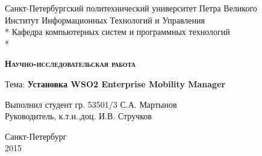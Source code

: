 \begin{titlepage}
\thispagestyle{empty}

\begin{center}
Санкт-Петербургский политехнический университет Петра Великого\\
Институт Информационных Технологий и Управления\\*
Кафедра компьютерных систем и программных технологий\\*
\hrulefill
\end{center}

\vspace{15em}

\begin{center}
\textsc{\textbf{Научно-исследовательская работа}}
\vspace{1em}

\vspace{2em}

Тема: \textbf{Установка WSO2 Enterprise Mobility Manager}
\end{center}

\vspace{16em}

\begin{flushleft}
Выполнил студент гр. 53501/3 \hrulefill С.А. Мартынов \\
\vspace{1.5em}
Руководитель, к.т.н.,доц. \hrulefill И.В. Стручков\\
\end{flushleft}

\vspace{\fill}

\begin{center}
Санкт-Петербург \\
2015
\end{center}

\end{titlepage}
\setcounter{page}{2}